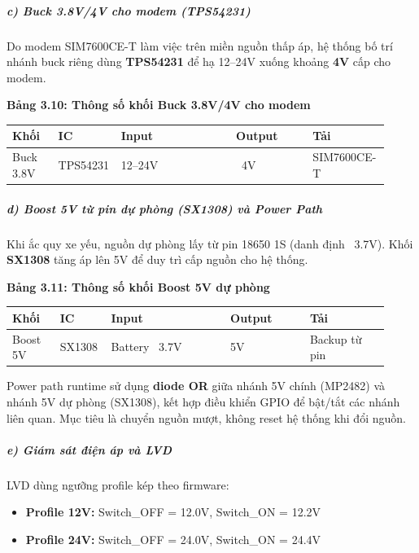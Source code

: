 \documentclass[13pt,a4paper]{extarticle}
\newcounter{none} %
\newcommand{\thesislongtableorignewline}{}
\let\thesislongtableorignewline\\
\renewcommand{\\}{\thesislongtableorignewline\hline}%
\let\\\thesislongtableorignewline
\newcommand{\thesistabletitle}[1]{%
  \begin{center}\textbf{#1}\end{center}%
}
\providecommand{\tightlist}{%
  \setlength{\itemsep}{0pt}\setlength{\parskip}{0pt}}
\begin{document}
\subparagraph{c) Buck 3.8V/4V cho modem
(TPS54231)}\label{c-buck-38v4v-cho-modem-tps54231}

Do modem SIM7600CE-T làm việc trên miền nguồn thấp áp, hệ thống bố trí
nhánh buck riêng dùng \textbf{TPS54231} để hạ 12--24V xuống khoảng
\textbf{4V} cấp cho modem.

\thesistabletitle{Bảng 3.10: Thông số khối Buck 3.8V/4V cho modem}

{\def\LTcaptype{none} %
\begin{longtable}{|p{0.12\linewidth}|p{0.10\linewidth}|p{0.30\linewidth}|p{0.20\linewidth}|p{0.20\linewidth}|}
\hline \textbf{Khối} & \textbf{IC} & \textbf{Input} & \textbf{Output} & \textbf{Tải} \\
\hline
\endhead
\hline
\endlastfoot
Buck 3.8V & TPS54231 & 12--24V & ~4V & SIM7600CE-T \\
\end{longtable}
}

\subparagraph{d) Boost 5V từ pin dự phòng (SX1308) và Power
Path}\label{d-boost-5v-tux1eeb-pin-dux1ef1-phuxf2ng-sx1308-vuxe0-power-path}

Khi ắc quy xe yếu, nguồn dự phòng lấy từ pin 18650 1S (danh định
~3.7V). Khối \textbf{SX1308} tăng áp lên 5V để duy trì cấp
nguồn cho hệ thống.

\thesistabletitle{Bảng 3.11: Thông số khối Boost 5V dự phòng}

{\def\LTcaptype{none} %
\begin{longtable}{|p{0.12\linewidth}|p{0.10\linewidth}|p{0.30\linewidth}|p{0.20\linewidth}|p{0.20\linewidth}|}
\hline \textbf{Khối} & \textbf{IC} & \textbf{Input} & \textbf{Output} & \textbf{Tải} \\
\hline
\endhead
\hline
\endlastfoot
Boost 5V & SX1308 & Battery ~3.7V & 5V & Backup từ pin \\
\end{longtable}
}

Power path runtime sử dụng \textbf{diode OR} giữa nhánh 5V chính
(MP2482) và nhánh 5V dự phòng (SX1308), kết hợp điều khiển GPIO để
bật/tắt các nhánh liên quan. Mục tiêu là chuyển nguồn mượt, không reset
hệ thống khi đổi nguồn.

\subparagraph{e) Giám sát điện áp và
LVD}\label{e-giuxe1m-suxe1t-ux111iux1ec7n-uxe1p-vuxe0-lvd}

LVD dùng ngưỡng profile kép theo firmware:

\begin{itemize}
\tightlist
\item
  \textbf{Profile 12V:} Switch\_OFF = 12.0V, Switch\_ON = 12.2V
\item
  \textbf{Profile 24V:} Switch\_OFF = 24.0V, Switch\_ON = 24.4V
\end{itemize}
\end{document}
